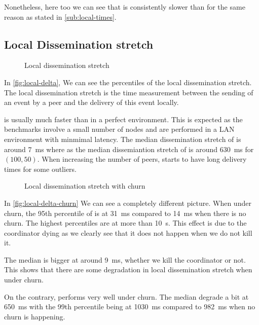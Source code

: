 Nonetheless, here too we can see that \epto is consistently slower than \jgroups for the same reason as stated in \autoref{sub:local-times}.
\newpage
\subsection{Local Dissemination stretch}
\begin{figure*}[htp]
	\centering
	
	\vspace{-2mm} 
	\caption{Local dissemination stretch}
	\vspace{-2mm}
	\label{fig:local-delta}  
\end{figure*}
In \autoref{fig:local-delta}, We can see the percentiles of the local dissemination stretch. The local dissemination stretch is the time measurement between the sending of an event by a peer and the delivery of this event locally.

\jgroups is usually much faster than \epto in a perfect environment. This is expected as the benchmarks involve a small number of nodes and are performed in a LAN environment with minmimal latency. The median dissemination stretch of \jgroups is around \SI{7}{\milli\second} where as the median dissemiantion stretch of \epto is around \SI{630}{\milli\second} for $(100,50)$. When increasing the number of peers, \jgroups starts to have long delivery times for some outliers.

\begin{figure}[htp]
	\centering
	
	\vspace{-2mm} 
	\caption{Local dissemination stretch with churn}
	\vspace{-2mm}
	\label{fig:local-delta-churn}   
\end{figure}
In \autoref{fig:local-delta-churn} We can see a completely different picture. When under churn, the 95th percentile of \jgroups is at \SI{31}{\milli\second} compared to \SI{14}{\milli\second} when there is no churn. The highest percentiles are at more than \SI{10}{\second}. This effect is due to the coordinator dying as we clearly see that it does not happen when we do not kill it.

The median is bigger at around \SI{9}{\milli\second}, whether we kill the coordinator or not. This shows that there are some degradation in \jgroups local dissemination stretch when under churn.

On the contrary, \epto performs very well under churn. The median degrade a bit at \SI{650}{\milli\second} with the 99th percentile being at \SI{1030}{\milli\second} compared to \SI{982}{\milli\second} when no churn is happening.
\newpage
